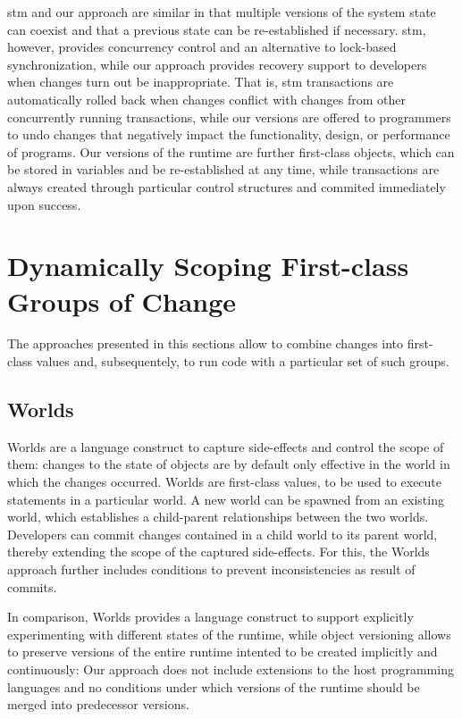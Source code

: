 \ac{stm} and our approach are similar in that multiple versions of the system state can coexist and that a previous state can be re-established if necessary.
\ac{stm}, however, provides concurrency control and an alternative to lock-based synchronization, while our approach provides recovery support to developers when changes turn out be inappropriate.
That is, \ac{stm} transactions are automatically rolled back when changes conflict with changes from other concurrently running transactions, while our versions are offered to programmers to undo changes that negatively impact the functionality, design, or performance of programs. 
Our versions of the runtime are further first-class objects, which can be stored in variables and be re-established at any time, while transactions are always created through particular control structures and commited immediately upon success.



\section{Dynamically Scoping First-class Groups of Change}

The approaches presented in this sections allow to combine changes into first-class values and, subsequentely, to run code with a particular set of such groups.


\subsection{Worlds}

Worlds are a language construct to capture side-effects and control the scope of them: changes to the state of objects are by default only effective in the world in which the changes occurred.
Worlds are first-class values, to be used to execute statements in a particular world.
A new world can be spawned from an existing world, which establishes a child-parent relationships between the two worlds.
Developers can commit changes contained in a child world to its parent world, thereby extending the scope of the captured side-effects.
For this, the Worlds approach further includes conditions to prevent inconsistencies as result of commits.

In comparison, Worlds provides a language construct to support explicitly experimenting with different states of the runtime, while object versioning allows to preserve versions of the entire runtime intented to be created implicitly and continuously: Our approach does not include extensions to the host programming languages and no conditions under which versions of the runtime should be merged into predecessor versions.

